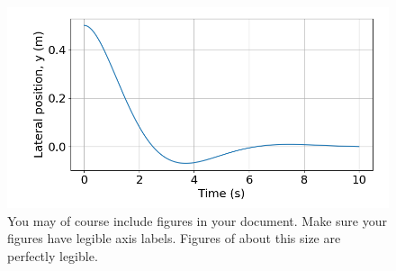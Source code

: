     
    
    \begin{figure}[h]
        \centering
        \includegraphics[width=0.65\linewidth]{figures/lateral_position}
        \caption{You may of course include figures in your document. Make sure your figures have legible axis labels. Figures of about this size are perfectly legible.}
    \end{figure}
